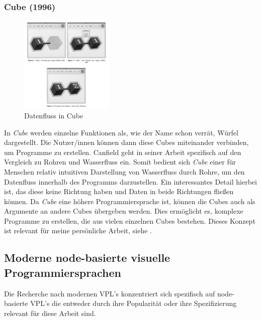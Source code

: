 \documentclass[ngerman]{article}
\begin{document}
\subsubsection{Cube (1996)}

\begingroup
\setlength\intextsep{2pt}

\begin{minipage}{\linewidth}
\begin{figure}
  \centering
  \includegraphics[width=0.4\textwidth]{./graphics/cube_vpl.png} %
  \caption{Datenfluss in Cube \cite{najork1996programming}}
  \label{fig:cube_demo}
\end{figure}
    \cite{najork1996programming}
In \textit{Cube} werden einzelne Funktionen als, wie der Name schon verrät, Würfel dargestellt. Die Nutzer/innen können dann diese Cubes miteinander verbinden, um Programme zu erstellen.
Canfield geht in seiner Arbeit spezifisch auf den Vergleich zu Rohren und Wasserfluss ein. Somit bedient sich \textit{Cube} einer für Menschen relativ intuitiven Darstellung von Wasserfluss durch Rohre, um den Datenfluss innerhalb des Programms darzustellen.
  Ein interessantes Detail hierbei ist, das diese  keine Richtung haben und Daten in beide Richtungen fließen können. 
Da \textit{Cube} eine höhere Programmiersprache ist, können die Cubes auch als Argumente an andere Cubes übergeben werden. Dies ermöglicht es, komplexe Programme zu erstellen, die aus vielen einzelnen Cubes bestehen. 
\br
Dieses Konzept ist relevant für meine persönliche Arbeit, siehe .

\end{minipage}
\endgroup
\pagebreak

\subsection{Moderne node-basierte visuelle Programmiersprachen}
Die Recherche nach modernen VPL's konzentriert sich spezifisch auf node-basierte VPL's die entweder durch ihre Popularität oder ihre Spezifizierung relevant für diese Arbeit sind.
\end{document}
